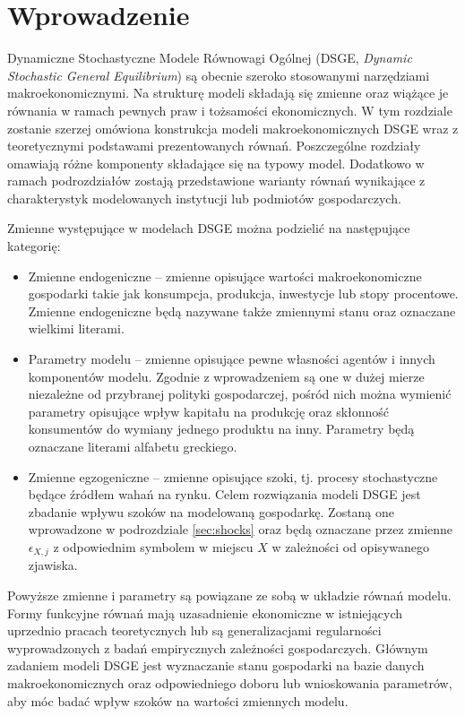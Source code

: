\section{Wprowadzenie}
\label{sec:models_intro}

Dynamiczne Stochastyczne Modele Równowagi Ogólnej (DSGE, \emph{Dynamic Stochastic General Equilibrium}) są obecnie szeroko stosowanymi narzędziami makroekonomicznymi. Na strukturę modeli składają się zmienne oraz wiążące je równania w ramach pewnych praw i tożsamości ekonomicznych. W tym rozdziale zostanie szerzej omówiona konstrukcja modeli makroekonomicznych DSGE wraz z teoretycznymi podstawami prezentowanych równań. Poszczególne rozdziały omawiają różne komponenty składające się na typowy model. Dodatkowo w ramach podrozdziałów zostają przedstawione warianty równań wynikające z charakterystyk modelowanych instytucji lub podmiotów gospodarczych.

Zmienne występujące w modelach DSGE można podzielić na następujące kategorię:
\begin{itemize}
    \item Zmienne endogeniczne -- zmienne opisujące wartości makroekonomiczne gospodarki takie jak konsumpcja, produkcja, inwestycje lub stopy procentowe. Zmienne endogeniczne będą nazywane także zmiennymi stanu oraz oznaczane wielkimi literami.
    \item Parametry modelu -- zmienne opisujące pewne własności agentów i innych komponentów modelu. Zgodnie z wprowadzeniem są one w dużej mierze niezależne od przybranej polityki gospodarczej, pośród nich można wymienić parametry opisujące wpływ kapitału na produkcję oraz skłonność konsumentów do wymiany jednego produktu na inny. Parametry będą oznaczane literami alfabetu greckiego.
    \item Zmienne egzogeniczne -- zmienne opisujące szoki, tj. procesy stochastyczne będące źródłem wahań na rynku. Celem rozwiązania modeli DSGE jest zbadanie wpływu szoków na modelowaną gospodarkę. Zostaną one wprowadzone w podrozdziale \ref{sec:shocks} oraz będą oznaczane przez zmienne $\epsilon_{X, j}$ z odpowiednim symbolem w miejscu $X$ w zależności od opisywanego zjawiska.
\end{itemize}

Powyższe zmienne i parametry są powiązane ze sobą w układzie równań modelu. Formy funkcyjne równań mają uzasadnienie ekonomiczne w istniejących uprzednio pracach teoretycznych lub są generalizacjami regularności wyprowadzonych z badań empirycznych zależności gospodarczych. Głównym zadaniem modeli DSGE jest wyznaczanie stanu gospodarki na bazie danych makroekonomicznych oraz odpowiedniego doboru lub wnioskowania parametrów, aby móc badać wpływ szoków na wartości zmiennych modelu.

